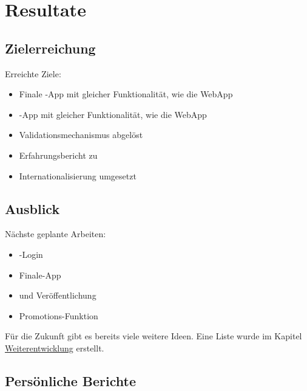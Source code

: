 \chapter{Resultate}
\label{tb-resultate}




\section{Zielerreichung}
Erreichte Ziele:

\begin{itemize}
	\item Finale -App mit gleicher Funktionalität, wie die \gls{WebApp}
	\item {}-App mit gleicher Funktionalität, wie die \gls{WebApp}
	\item Validationsmechanismus abgelöst
	\item Erfahrungsbericht zu 
	\item Internationalisierung umgesetzt
\end{itemize}

\section{Ausblick}
Nächste geplante Arbeiten:

\begin{itemize}
	\item {}-Login
	\item Finale-App
	\item {} und  Veröffentlichung
	\item Promotions-Funktion
\end{itemize}

Für die Zukunft gibt es bereits viele weitere Ideen. 
Eine Liste wurde im Kapitel \hyperref[pd-resultate-weiterentwicklung]{Weiterentwicklung} erstellt.

\section{Persönliche Berichte}

